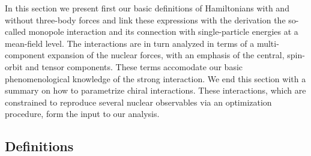 \documentclass[preprint,12pt,authoryear]{elsarticle}
\begin{document}
In this section we present first our basic definitions of Hamiltonians
with and without three-body forces and link these expressions with the
derivation the so-called monopole interaction and its connection with
single-particle energies at a mean-field level. The interactions are
in turn analyzed in terms of a multi-component expansion of the
nuclear forces, with an emphasis of the central, spin-orbit and tensor
components. These terms accomodate our basic phenomenological
knowledge of the strong interaction. We end this section with a
summary on how to parametrize chiral interactions. These interactions,
which are constrained to reproduce several nuclear observables via an
optimization procedure, form the input to our analysis.
 
\subsection{Definitions}\label{subsec:definitions}
\end{document}
